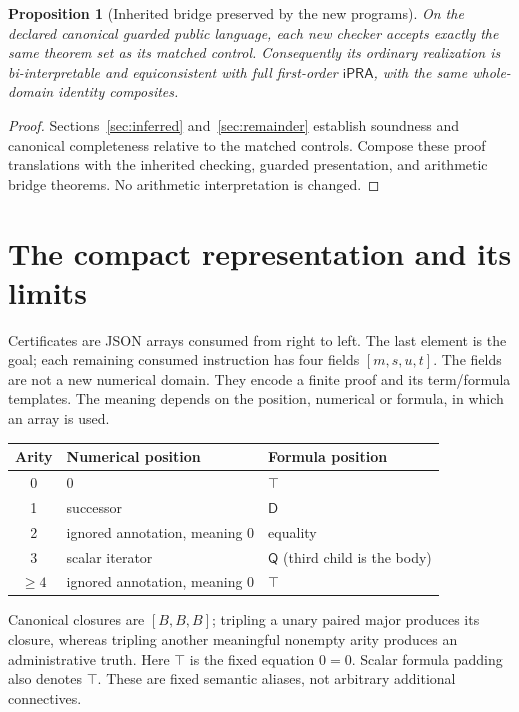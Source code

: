 \documentclass[11pt]{article}
\newtheorem{proposition}[theorem]{Proposition}
\theoremstyle{definition}
\theoremstyle{remark}
\newcommand{\D}{\mathsf D}
\newcommand{\Q}{\mathsf Q}
\newcommand{\ipra}{\mathsf{iPRA}}
\begin{document}
\begin{proposition}[Inherited bridge preserved by the new programs]
On the declared canonical guarded public language, each new checker
accepts exactly the same theorem set as its matched control.  Consequently
its ordinary realization is bi-interpretable and equiconsistent with full
first-order $\ipra$, with the same whole-domain identity composites.
\end{proposition}
\begin{proof}
Sections~\ref{sec:inferred} and~\ref{sec:remainder} establish soundness and
canonical completeness relative to the matched controls.  Compose these
proof translations with the inherited checking, guarded presentation,
and arithmetic bridge theorems.  No arithmetic interpretation is changed.
\end{proof}

\section{The compact representation and its limits}

Certificates are JSON arrays consumed from right to left.  The last element
is the goal; each remaining consumed instruction has four fields
$[m,s,u,t]$.  The fields are not a new numerical domain.  They encode a
finite proof and its term/formula templates.  The meaning depends on the
position, numerical or formula, in which an array is used.

\begin{center}
\begin{tabular}{cll}
\toprule
Arity & Numerical position & Formula position\\
\midrule
0 & $0$ & $\top$\\
1 & successor & $\D$\\
2 & ignored annotation, meaning $0$ & equality\\
3 & scalar iterator & $\Q$ (third child is the body)\\
$\ge4$ & ignored annotation, meaning $0$ & $\top$\\
\bottomrule
\end{tabular}
\end{center}

Canonical closures are $[B,B,B]$; tripling a unary paired major produces
its closure, whereas tripling another meaningful nonempty arity produces
an administrative truth.  Here $\top$ is the fixed equation $0=0$.
Scalar formula padding also denotes $\top$.  These are fixed semantic
aliases, not arbitrary additional connectives.
\end{document}
